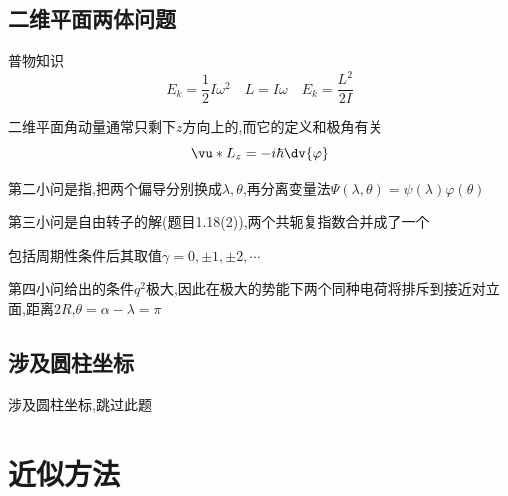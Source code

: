         \subsection{二维平面两体问题}
            \begin{formal}
                普物知识
                $$ E_{k} = \frac{1}{2} I \omega^{2} \quad L = I \omega \quad E_{k} = \frac{L^{2}}{2I} $$

                二维平面角动量通常只剩下$z$方向上的,而它的定义和极角有关
                $$ \vu*{L}_{z} = -i \hbar \dv{\varphi}   $$ 
            \end{formal}

            第二小问是指,把两个偏导分别换成$\lambda,\theta$,再分离变量法$ \Psi(\lambda,\theta) = \psi(\lambda)\varphi(\theta)  $

            第三小问是自由转子的解(题目1.18(2)),两个共轭复指数合并成了一个
            
            包括周期性条件后其取值$\gamma = 0,\pm1,\pm2,\cdots$

            第四小问给出的条件$q^{2}$极大,因此在极大的势能下两个同种电荷将排斥到接近对立面,距离$2R$,$\theta = \alpha - \lambda = \pi$

        \subsection{涉及圆柱坐标}
            涉及圆柱坐标,跳过此题









    \section{近似方法}


